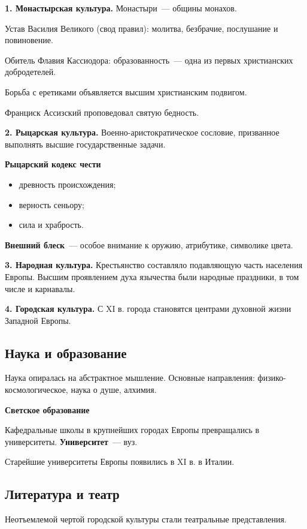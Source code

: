 \documentclass[a4paper, 12pt]{article}
\begin{document}
\textbf{1. Монастырская культура.} Монастыри~--- общины монахов.

Устав Василия Великого (свод правил): молитва, безбрачие, послушание
и повиновение.

Обитель Флавия Кассиодора: образованность~--- одна из первых христианских
добродетелей.

Борьба с еретиками объявляется высшим христианским подвигом.

Франциск Ассизский проповедовал святую бедность.

\textbf{2. Рыцарская культура.} Военно-аристократическое сословие, призванное
выполнять высшие государственные задачи.

\begin{center}
\textbf{Рыцарский кодекс чести}
\end{center}
\begin{itemize}[noitemsep]
  \item древность происхождения;
  \item верность сеньору;
  \item сила и храбрость.
\end{itemize}

\textbf{Внешний блеск}~--- особое внимание к оружию, атрибутике, символике
цвета.

\textbf{3. Народная культура.} Крестьянство составляло подавляющую часть
населения Европы. Высшим проявлением духа язычества были народные праздники,
в том числе и карнавалы.

\textbf{4. Городская культура.} С XI в. города становятся центрами духовной
жизни Западной Европы.

\subsection{Наука и образование}
Наука опиралась на абстрактное мышление. Основные направления:
физико-космологическое, наука о душе, алхимия.

\begin{center}
\textbf{Светское образование}
\end{center}

Кафедральные школы в крупнейших городах Европы превращались в университеты.
\textbf{Университет}~--- вуз.

Старейшие университеты Европы появились в XI в. в Италии.

\subsection{Литература и театр}
Неотъемлемой чертой городской культуры стали театральные представления.
\end{document}
